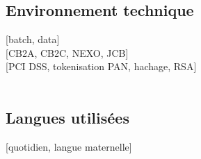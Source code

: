 {    \subsection{Environnement technique}
     [batch, data]  \\
    [CB2A, CB2C, NEXO, JCB]\\
    [PCI DSS, tokenisation PAN, hachage, RSA]\\
       \\
     

    \subsection{Langues utilisées}
    [quotidien, langue maternelle]
}
\makebody
\clearpage